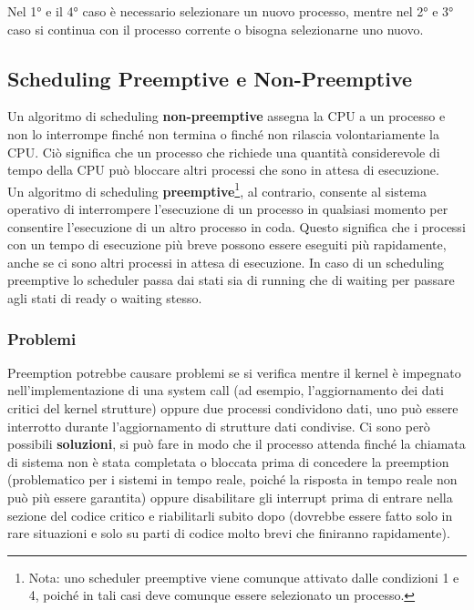 \documentclass{article}
\begin{document}
Nel 1° e il 4° caso è necessario selezionare un nuovo processo, mentre nel 2° e 3° caso si continua con il processo corrente o bisogna selezionarne uno nuovo. 
\subsection{Scheduling Preemptive e Non-Preemptive}
Un algoritmo di scheduling \textbf{non-preemptive} assegna la CPU a un processo e non lo interrompe finché non termina o finché non rilascia volontariamente la CPU. Ciò significa che un processo che richiede una quantità considerevole di tempo della CPU può bloccare altri processi che sono in attesa di esecuzione.\\ 

Un algoritmo di scheduling \textbf{preemptive}\footnote{Nota: uno scheduler preemptive viene comunque attivato dalle condizioni 1 e 4, poiché in tali casi deve comunque essere selezionato un processo.}, al contrario, consente al sistema operativo di interrompere l'esecuzione di un processo in qualsiasi momento per consentire l'esecuzione di un altro processo in coda. Questo significa che i processi con un tempo di esecuzione più breve possono essere eseguiti più rapidamente, anche se ci sono altri processi in attesa di esecuzione. In caso di un scheduling preemptive lo scheduler passa dai stati sia di running che di waiting per passare agli stati di ready o waiting stesso.  
\subsubsection{Problemi}
Preemption potrebbe causare problemi se si verifica mentre il kernel è impegnato nell'implementazione di una system call (ad esempio, l'aggiornamento dei dati critici del kernel strutture) oppure due processi condividono dati, uno può essere interrotto durante l'aggiornamento di strutture dati condivise. Ci sono però possibili \textbf{soluzioni}, si può fare in modo che il processo attenda finché la chiamata di sistema non è stata completata o bloccata prima di concedere la preemption (problematico per i sistemi in tempo reale, poiché la risposta in tempo reale non può più essere garantita) oppure disabilitare gli interrupt prima di entrare nella sezione del codice critico e riabilitarli subito dopo (dovrebbe essere fatto solo in rare situazioni e solo su parti di codice molto brevi che finiranno rapidamente). \\
\end{document}
